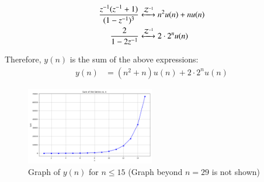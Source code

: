 \documentclass[journal,12pt,onecolumn]{IEEEtran}
\theoremstyle{remark}
\begin{document}
\begin{align}
\frac{z^{-1}(z^{-1} + 1)}{(1 - z^{-1})^3}  &\xleftrightarrow{\mathcal{Z}^{-1}} n^2 u(n) + n u(n) \\
\frac{2}{1 - 2z^{-1}} &\xleftrightarrow{\mathcal{Z}^{-1}} 2 \cdot 2^n u(n)
\end{align}

Therefore, \( y(n) \) is the sum of the above expressions:
\begin{align}
y(n) &= (n^2 + n) u(n) + 2 \cdot 2^n u(n)
\end{align}

\begin{figure}[ht]
    \centering
    \includegraphics[width=0.5\textwidth]{code/main.png}
    \caption{Graph of $y(n)$ for $n \leq 15$ (Graph beyond $n = 29$ is not shown)}
    \label{fig:example}
\end{figure}
\end{document}

